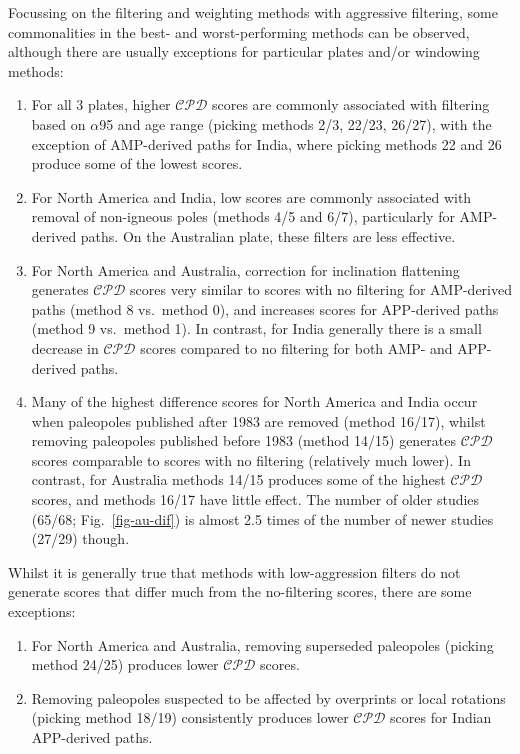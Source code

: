 Focussing on the filtering and weighting methods with aggressive filtering,
some commonalities in the best- and worst-performing methods can be observed,
although there are usually exceptions for particular plates and/or windowing
methods:
%
\begin{enumerate}
  \item For all 3 plates, higher $\mathcal{CPD}$ scores are commonly associated
		with filtering based on $\alpha$95 and age range (picking methods
		2/3, 22/23, 26/27), with the exception of AMP-derived paths for India,
		where picking methods 22 and 26 produce some of the lowest scores.
  \item For North America and India, low scores are commonly associated with
		removal of non-igneous poles (methods 4/5 and 6/7), particularly for
		AMP-derived paths. On the Australian plate, these filters are less
		effective.
  \item For North America and Australia, correction for inclination flattening
		generates $\mathcal{CPD}$ scores very similar to scores with no
		filtering for AMP-derived paths (method 8 vs.\ method 0), and increases
		scores for APP-derived paths (method 9 vs.\ method 1). In contrast, for
		India generally there is a small decrease in $\mathcal{CPD}$ scores
		compared to no filtering for both AMP- and APP-derived paths.
  \item Many of the highest difference scores for North America and India occur
		when paleopoles published after 1983 are removed (method 16/17), whilst
		removing paleopoles published before 1983 (method 14/15) generates
		$\mathcal{CPD}$ scores comparable to scores with no filtering
		(relatively much lower). In contrast, for Australia methods 14/15
		produces some of the highest $\mathcal{CPD}$ scores, and methods 16/17
		have little effect. The number of older studies (65/68;
		Fig.~\ref{fig-au-dif}) is almost 2.5 times of the number of newer
		studies (27/29) though.
\end{enumerate}

Whilst it is generally true that methods with low-aggression filters do not
generate scores that differ much from the no-filtering scores, there are some
exceptions:
%
\begin{enumerate}
  \item For North America and Australia, removing superseded paleopoles (picking
		method 24/25) produces lower $\mathcal{CPD}$ scores.
  \item Removing paleopoles suspected to be affected by overprints or local
		rotations (picking method 18/19) consistently produces lower
		$\mathcal{CPD}$ scores for Indian APP-derived paths.
\end{enumerate}

